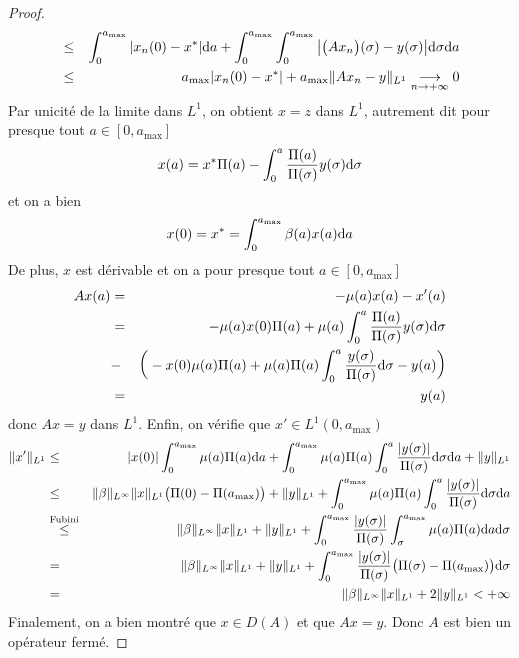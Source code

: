 \begin{proof}
\begin{eqnarray*}
        &\leq& \int_0^{a_{\max}} |x_n(0)-x^*|\mathrm{d} a +\int_0^{a_{\max}} \int_0^{a_{\max}} \big|\big(Ax_n\big)(\sigma) - y(\sigma)\big|\mathrm{d} \sigma \mathrm{d} a \\
        &\leq& a_{\max} |x_n(0)-x^*| + a_{\max} \|Ax_n-y\|_{L^1}\underset{n \to +\infty}{\longrightarrow} 0
    \end{eqnarray*}
    Par unicité de la limite dans $L^1$, on obtient $x=z$ dans $L^1$, autrement dit pour presque tout $a \in [0,a_{\max}]$
    \begin{equation*}
        x(a) = x^*\Pi(a) - \int_0^a \frac{\Pi(a)}{\Pi(\sigma)}y(\sigma)\mathrm{d} \sigma
    \end{equation*}
    et on a bien 
    \begin{equation*}
        x(0) = x^* = \int_0^{a_{\max}} \beta(a)x(a)\mathrm{d} a
    \end{equation*}
    De plus, $x$ est dérivable et on a pour presque tout $a \in [0,a_{\max}]$
    \begin{eqnarray*}
        Ax(a) &=& -\mu(a)x(a) - x'(a) \\
        &=& -\mu(a)x(0)\Pi(a) + \mu(a)\int_0^a \frac{\Pi(a)}{\Pi(\sigma)} y(\sigma)\mathrm{d} \sigma \\
        &-& \bigg(-x(0)\mu(a)\Pi(a)+ \mu(a)\Pi(a)\int_0^a \frac{y(\sigma)}{\Pi(\sigma)}\mathrm{d} \sigma - y(a)\bigg) \\
        &=& y(a)
    \end{eqnarray*}
    donc $Ax=y$ dans $L^1$. Enfin, on vérifie que $x' \in L^1(0,a_{\max})$
    \begin{eqnarray*}
        \|x'\|_{L^1} &\leq& |x(0)|\int_0^{a_{\max}}\mu(a)\Pi(a)\mathrm{d} a + \int_0^{a_{\max}} \mu(a)\Pi(a) \int_0^a \frac{|y(\sigma)|}{\Pi(\sigma)}\mathrm{d} \sigma \mathrm{d} a + \|y\|_{L^1} \\
        &\leq& \|\beta\|_{L^\infty} \|x\|_{L^1}\big(\Pi(0)-\Pi(a_{\max})\big)+\|y\|_{L^1}+ \int_0^{a_{\max}} \mu(a)\Pi(a) \int_0^a \frac{|y(\sigma)|}{\Pi(\sigma)}\mathrm{d} \sigma \mathrm{d} a \\ 
        &\overset{\text{Fubini}}{\leq}& \|\beta\|_{L^\infty}\|x\|_{L^1}+\|y\|_{L^1} + \int_0^{a_{\max}}\frac{|y(\sigma)|}{\Pi(\sigma)} \int_{\sigma}^{a_{\max}} \mu(a)\Pi(a)\mathrm{d} a \mathrm{d} \sigma \\ 
        &=& \|\beta\|_{L^\infty}\|x\|_{L^1}+\|y\|_{L^1} + \int_0^{a_{\max}}\frac{|y(\sigma)|}{\Pi(\sigma)} \big(\Pi(\sigma)-\Pi(a_{\max})\big)\mathrm{d} \sigma \\
        &=& \|\beta\|_{L^\infty} \|x\|_{L^1} + 2 \|y\|_{L^1} <+\infty
    \end{eqnarray*}
    Finalement, on a bien montré que $x \in D(A)$ et que $Ax=y$. Donc $A$ est bien un opérateur fermé.
\end{proof}

